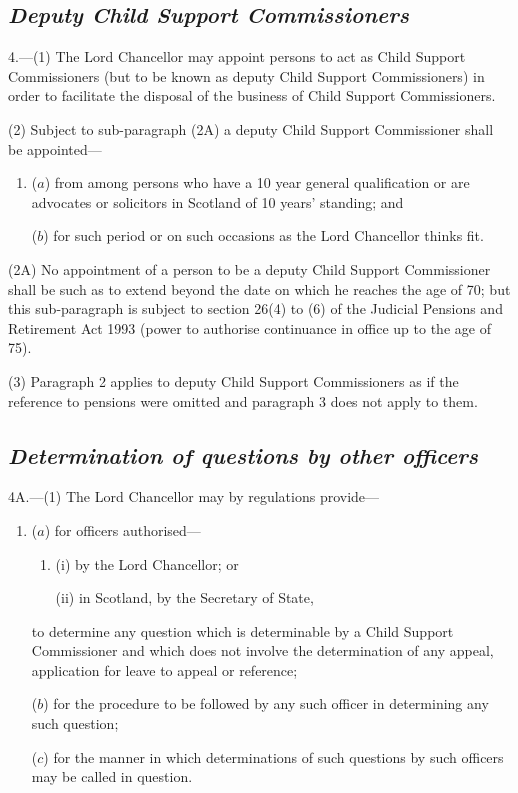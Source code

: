 \documentclass[12pt,a4paper]{article}
\begin{document}
\subsection*{\itshape Deputy Child Support Commissioners}

4.---(1) The Lord Chancellor may appoint persons to act as Child Support Commissioners (but to be known as deputy Child Support Commissioners) in order to facilitate the disposal of the business of Child Support Commissioners.

(2) 
Subject to sub-paragraph (2A)  %
a deputy Child Support Commissioner shall be appointed—
\begin{enumerate}\item[]
($a$) from among persons who have a 10 year general qualification or are advocates or solicitors in Scotland of 10 years' standing; and

($b$) for such period or on such occasions as the Lord Chancellor thinks fit.
\end{enumerate}

(2A) No appointment of a person to be a deputy Child Support Commissioner shall be such as to extend beyond the date on which he reaches the age of 70; but this sub-paragraph is subject to section 26(4) to (6) of the Judicial Pensions and Retirement Act 1993 (power to authorise continuance in office up to the age of 75).

(3) Paragraph 2 applies to deputy Child Support Commissioners as if the reference to pensions were omitted and paragraph 3 does not apply to them.


\subsection*{\itshape Determination of questions by other officers}

4A.---(1) The Lord Chancellor may by regulations provide—
\begin{enumerate}\item[]
($a$) for officers authorised—
\begin{enumerate}\item[]
(i) by the Lord Chancellor; or

(ii) in Scotland, by the Secretary of State,
\end{enumerate}
to determine any question which is determinable by a Child Support Commissioner and which does not involve the determination of any appeal, application for leave to appeal or reference;

($b$) for the procedure to be followed by any such officer in determining any such question;

($c$) for the manner in which determinations of such questions by such officers may be called in question.
\end{enumerate}
\end{document}
